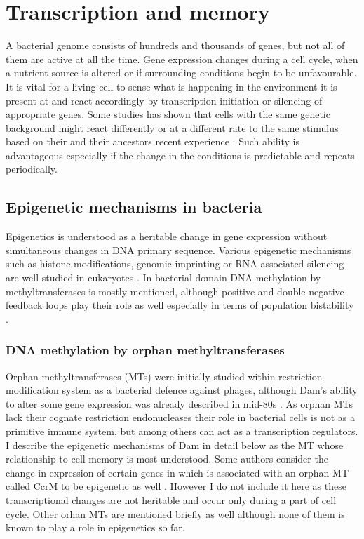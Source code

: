 \section{Transcription and memory}
A bacterial genome consists of hundreds and thousands of genes, but not all of them are active at all the time.
Gene expression changes during a cell cycle, when a nutrient source is altered or if surrounding conditions begin to be unfavourable.
It is vital for a living cell to sense what is happening in the environment it is present at and react accordingly by transcription initiation or silencing of appropriate genes.
Some studies has shown that cells with the same genetic background might react differently or at a different rate to the same stimulus based on their and their ancestors recent experience \cite{mathis2017asymmetric, ronin2017long}.
Such ability is advantageous especially if the change in the conditions is predictable and repeats periodically.

\subsection{Epigenetic mechanisms in bacteria}
Epigenetics is understood as a heritable change in gene expression without simultaneous changes in DNA primary sequence.
Various epigenetic mechanisms such as histone modifications, genomic imprinting or RNA associated silencing are well studied in eukaryotes \cite{durso2014mechanisms}.
In bacterial domain DNA methylation by methyltransferases is mostly mentioned, although positive and double negative feedback loops play their role as well especially in terms of population bistability \cite{casadesus2006epigenetic, casadesus2013programmed, adhikari2016dna}.

\subsubsection{DNA methylation by orphan methyltransferases}
Orphan methyltransferases (MTs) were initially studied within restriction-modification system as a bacterial defence against phages, although Dam's ability to alter some gene expression was already described in mid-80s \cite{sternberg1985evidence, bickle1993biology}.
As orphan MTs lack their cognate restriction endonucleases their role in bacterial cells is not as a primitive immune system, but among others can act as a transcription regulators.
I describe the epigenetic mechanisms of Dam in detail below as the MT whose relationship to cell memory is most understood.
Some authors consider the change in expression of certain genes in  which is associated with an orphan MT called CcrM to be epigenetic as well \cite{casadesus2006epigenetic, adhikari2016dna}.
However I do not include it here as these transcriptional changes are not heritable and occur only during a part of cell cycle.
Other  orhan MTs are mentioned briefly as well although none of them is known to play a role in epigenetics so far.

